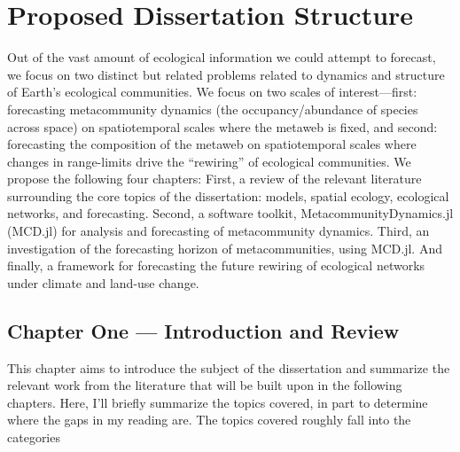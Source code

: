 \documentclass[]{article}
\begin{document}
\clearpage
\section{Proposed Dissertation Structure}
Out of the vast amount of ecological information we could attempt to forecast, we focus on two distinct but related problems related to dynamics and structure of Earth's ecological communities. We focus on two scales of interest---first: forecasting metacommunity dynamics (the occupancy/abundance of species across space) on spatiotemporal scales where the metaweb is fixed, and second: forecasting the composition of the metaweb on spatiotemporal scales where changes in range-limits drive the ``rewiring'' of ecological communities. We propose the following four chapters:
First, a review of the relevant literature surrounding the core topics of the dissertation: models, spatial ecology, ecological networks, and forecasting. Second, a software toolkit, MetacommunityDynamics.jl (MCD.jl) for analysis and forecasting of metacommunity dynamics. Third, an investigation of the forecasting horizon of metacommunities, using MCD.jl. And finally, a framework for forecasting the future rewiring of ecological networks under climate and land-use change.

\subsection{Chapter One --- Introduction and Review}

This chapter aims to introduce the subject of the dissertation and summarize the relevant work from the literature that will be built upon in the following chapters. Here, I'll briefly summarize the topics covered, in part to determine where the gaps in my reading are. The topics covered roughly fall into the categories
\end{document}

